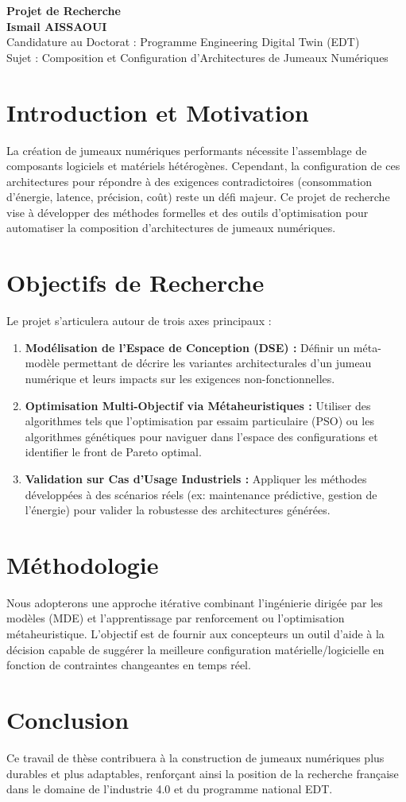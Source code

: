 \documentclass[a4paper,11pt]{article}
\begin{document}
\begin{center}
    {\huge \textbf{Projet de Recherche}} \\
    \bigskip
    {\large \textbf{Ismail AISSAOUI}} \\
    Candidature au Doctorat : Programme Engineering Digital Twin (EDT) \\
    Sujet : Composition et Configuration d'Architectures de Jumeaux Numériques
\end{center}

\bigskip

\section{Introduction et Motivation}
La création de jumeaux numériques performants nécessite l'assemblage de composants logiciels et matériels hétérogènes. Cependant, la configuration de ces architectures pour répondre à des exigences contradictoires (consommation d'énergie, latence, précision, coût) reste un défi majeur. Ce projet de recherche vise à développer des méthodes formelles et des outils d'optimisation pour automatiser la composition d'architectures de jumeaux numériques.

\section{Objectifs de Recherche}
Le projet s'articulera autour de trois axes principaux :
\begin{enumerate}[label=\textbf{Axe \arabic*:}]
    \item \textbf{Modélisation de l'Espace de Conception (DSE) :} Définir un méta-modèle permettant de décrire les variantes architecturales d'un jumeau numérique et leurs impacts sur les exigences non-fonctionnelles.
    \item \textbf{Optimisation Multi-Objectif via Métaheuristiques :} Utiliser des algorithmes tels que l'optimisation par essaim particulaire (PSO) ou les algorithmes génétiques pour naviguer dans l'espace des configurations et identifier le front de Pareto optimal.
    \item \textbf{Validation sur Cas d'Usage Industriels :} Appliquer les méthodes développées à des scénarios réels (ex: maintenance prédictive, gestion de l'énergie) pour valider la robustesse des architectures générées.
\end{enumerate}

\section{Méthodologie}
Nous adopterons une approche itérative combinant l'ingénierie dirigée par les modèles (MDE) et l'apprentissage par renforcement ou l'optimisation métaheuristique. L'objectif est de fournir aux concepteurs un outil d'aide à la décision capable de suggérer la meilleure configuration matérielle/logicielle en fonction de contraintes changeantes en temps réel.

\section{Conclusion}
Ce travail de thèse contribuera à la construction de jumeaux numériques plus durables et plus adaptables, renforçant ainsi la position de la recherche française dans le domaine de l'industrie 4.0 et du programme national EDT.
\end{document}

